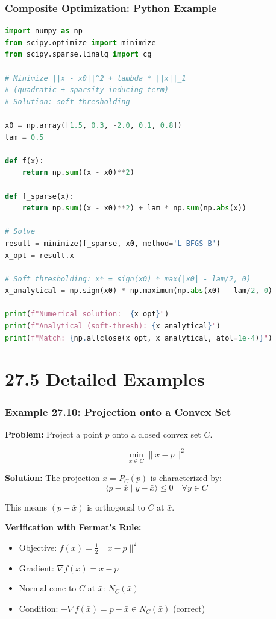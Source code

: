 \documentclass[aspectratio=169,10pt]{beamer}
\begin{document}
\begin{frame}[fragile]
\frametitle{Composite Optimization: Python Example}

\begin{lstlisting}[language=Python]
import numpy as np
from scipy.optimize import minimize
from scipy.sparse.linalg import cg

# Minimize ||x - x0||^2 + lambda * ||x||_1
# (quadratic + sparsity-inducing term)
# Solution: soft thresholding

x0 = np.array([1.5, 0.3, -2.0, 0.1, 0.8])
lam = 0.5

def f(x):
    return np.sum((x - x0)**2)

def f_sparse(x):
    return np.sum((x - x0)**2) + lam * np.sum(np.abs(x))

# Solve
result = minimize(f_sparse, x0, method='L-BFGS-B')
x_opt = result.x

# Soft thresholding: x* = sign(x0) * max(|x0| - lam/2, 0)
x_analytical = np.sign(x0) * np.maximum(np.abs(x0) - lam/2, 0)

print(f"Numerical solution:  {x_opt}")
print(f"Analytical (soft-thresh): {x_analytical}")
print(f"Match: {np.allclose(x_opt, x_analytical, atol=1e-4)}")
\end{lstlisting}

\end{frame}

\section{27.5 Detailed Examples}

\begin{frame}[allowframebreaks]
\frametitle{Example 27.10: Projection onto a Convex Set}

\textbf{Problem:} Project a point $p$ onto a closed convex set $C$.

\[\min_{x \in C} \|x - p\|^2\]

\vspace{0.2cm}

\textbf{Solution:} The projection $\bar{x} = P_C(p)$ is characterized by:
\[\langle p - \bar{x} \mid y - \bar{x} \rangle \leq 0 \quad \forall y \in C\]

This means $(p - \bar{x})$ is orthogonal to $C$ at $\bar{x}$.

\vspace{0.3cm}

\textbf{Verification with Fermat's Rule:}
\begin{itemize}
    \item Objective: $f(x) = \frac{1}{2}\|x - p\|^2$
    \item Gradient: $\nabla f(x) = x - p$
    \item Normal cone to $C$ at $\bar{x}$: $N_C(\bar{x})$
    \item Condition: $-\nabla f(\bar{x}) = p - \bar{x} \in N_C(\bar{x})$ (correct)
\end{itemize}

\end{frame}
\end{document}

